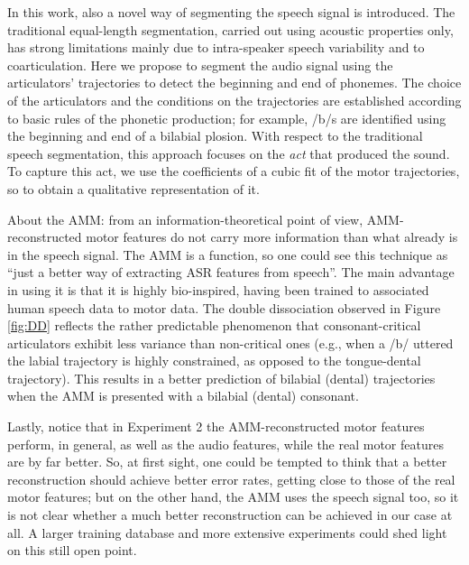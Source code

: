 In this work, also a novel way of segmenting the speech signal is introduced.
The traditional equal-length segmentation, carried out using acoustic properties
only, has strong limitations mainly due to intra-speaker speech variability and
to coarticulation. Here we propose to segment the audio signal using the articulators'
trajectories to detect the beginning and end of phonemes. The choice of the articulators
and the conditions on the trajectories are established according to basic rules of
the phonetic production; for example, /b/s are identified using the beginning and end of
a bilabial plosion. With respect to the traditional speech segmentation, this approach
focuses on the \emph{act} that produced the sound. To capture this act, we use the
coefficients of a cubic fit of the motor trajectories, so to obtain a qualitative
representation of it.

About the AMM: from an information-theoretical point of view, AMM-reconstructed
motor features do not carry more information than what already is in the speech signal.
The AMM is a function, so one could see this technique as
``just a better way of extracting ASR features from speech''.
The main advantage in using it is that it is highly bio-inspired,
having been trained to associated human speech data to motor data. The double dissociation
observed in Figure \ref{fig:DD} reflects the rather predictable phenomenon
that consonant-critical articulators exhibit less variance than non-critical ones (e.g.,
when a /b/ uttered the labial trajectory is highly constrained, as opposed to the tongue-dental
trajectory). This results in a better prediction of bilabial (dental) trajectories when the
AMM is presented with a bilabial (dental) consonant.

Lastly, notice that in Experiment 2 the AMM-reconstructed motor features perform, in general,
as well as the audio features, while the real motor features are by far better. So, at first
sight, one could be tempted to think that a better reconstruction should achieve better error
rates, getting close to those of the real motor features;
but on the other hand, the AMM uses the speech signal too, so it is not clear
whether a much better reconstruction can be achieved in our case at all. A larger training
database and more extensive experiments could shed light on this still open point.
